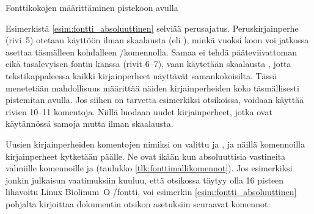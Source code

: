 \begin{esimerkki}
\caption{Fonttikokojen määrittäminen pistekoon avulla}
\label{esim:fontti_absoluuttinen}
\end{esimerkki}

Esimerkistä \ref{esim:fontti_absoluuttinen} selviää perus\-ajatus.
Peruskirjainperhe (rivi~5) otetaan käyttöön ilman skaalausta (eli
), minkä vuoksi koon voi jatkossa asettaa täsmälleen
kohdalleen \-/komennolla. Samaa ei tehdä
pääteviivattoman eikä tasalevyisen fontin kanssa (rivit 6--7), vaan
käytetään skaalausta , jotta tekstikappaleessa
kaikki kirjainperheet näyttävät samankokoisilta. Tässä menetetään
mahdollisuus määrittää näiden kirjainperheiden koko täsmällisesti
pistemitan avulla. Jos siihen on tarvetta esimerkiksi otsikoissa,
voidaan käyttää rivien 10--11 komentoja. Niillä luodaan uudet
kirjainperheet, jotka ovat käytännössä samoja mutta ilman skaalausta.

Uusien kirjainperheiden komentojen nimiksi on valittu  ja , ja näillä komennoilla
kirjainperheet kytketään päälle. Ne ovat ikään kun absoluuttisia
vastineita valmiille komennoille  ja  (taulukko \ref{tlk:fonttimallikomennot}). Jos esimerkiksi
jonkin julkaisun vaatimuksiin kuuluu, että otsikossa täytyy olla 16
pisteen lihavoitu Linux Biolinum~O \=/fontti, voi esimerkin
\ref{esim:fontti_absoluuttinen} pohjalta kirjoittaa dokumentin otsikon
asetuksiin seuraavat komennot:

